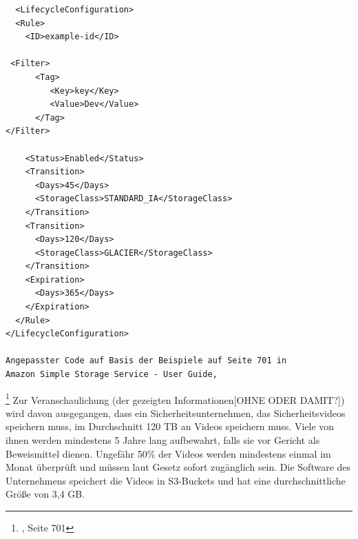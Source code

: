 \begin{lstlisting}
  <LifecycleConfiguration>
  <Rule>
    <ID>example-id</ID>
    
 <Filter>
      <Tag>
         <Key>key</Key>
         <Value>Dev</Value>
      </Tag>
</Filter>

    <Status>Enabled</Status>
    <Transition>
      <Days>45</Days>
      <StorageClass>STANDARD_IA</StorageClass>
    </Transition>
    <Transition>
      <Days>120</Days>
      <StorageClass>GLACIER</StorageClass>
    </Transition>
    <Expiration>
      <Days>365</Days>
    </Expiration>
  </Rule>
</LifecycleConfiguration>

Angepasster Code auf Basis der Beispiele auf Seite 701 in 
Amazon Simple Storage Service - User Guide, 
\end{lstlisting}
\footnote{\cite{AMZ18}, Seite 701}
Zur Veranschaulichung (der gezeigten Informationen[OHNE ODER DAMIT?]) wird davon ausgegangen, dass ein Sicherheitsunternehmen, das Sicherheitsvideos speichern muss, im Durchschnitt 120 TB an Videos speichern muss. Viele von ihnen werden mindestens 5 Jahre lang aufbewahrt, falls sie vor Gericht als Beweismittel dienen. Ungefähr 50\% der Videos werden mindestens einmal im Monat überprüft und müssen laut Gesetz sofort zugänglich sein. Die Software des Unternehmens speichert die Videos in S3-Buckets und hat eine durchschnittliche Größe von 3,4 GB.

